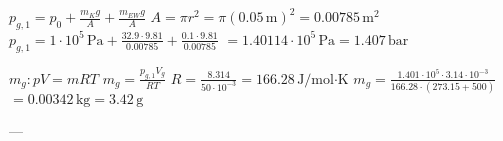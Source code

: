 \( p_{g,1} = p_0 + \frac{m_K g}{A} + \frac{m_{EW} g}{A} \)  
\( A = \pi r^2 = \pi (0.05 \, \text{m})^2 = 0.00785 \, \text{m}^2 \)  
\( p_{g,1} = 1 \cdot 10^5 \, \text{Pa} + \frac{32.9 \cdot 9.81}{0.00785} + \frac{0.1 \cdot 9.81}{0.00785} \)  
\( = 1.40114 \cdot 10^5 \, \text{Pa} = 1.407 \, \text{bar} \)  

\( m_g: pV = mRT \)  
\( m_g = \frac{p_{g,1} V_g}{RT} \)  
\( R = \frac{8.314}{50 \cdot 10^{-3}} = 166.28 \, \text{J/mol·K} \)  
\( m_g = \frac{1.401 \cdot 10^5 \cdot 3.14 \cdot 10^{-3}}{166.28 \cdot (273.15 + 500)} \)  
\( = 0.00342 \, \text{kg} = 3.42 \, \text{g} \)  

---